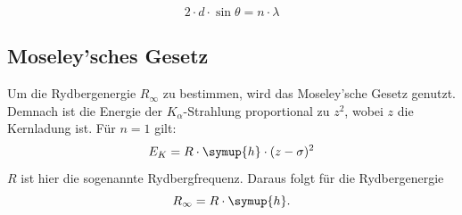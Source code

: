 \begin{equation}
    \label{eqn:BraggBedingung}
    2 \cdot d \cdot \sin\theta = n \cdot \lambda
\end{equation}

\subsection{Moseley'sches Gesetz}
\label{subsec:moseley}
Um die Rydbergenergie $R_{\infty}$ zu bestimmen, wird das Moseley'sche Gesetz genutzt.
Demnach ist die Energie der $K_\alpha$-Strahlung proportional zu $z^2$, wobei $z$ die Kernladung ist.
Für $n = 1$ gilt:
\begin{equation}
    \label{eqn:moseley}
    E_K = R \cdot \symup{h} \cdot (z - \sigma)^2
\end{equation}
$R$ ist hier die sogenannte Rydbergfrequenz.
Daraus folgt für die Rydbergenergie
\begin{equation}
    \label{eqn:rydbergenergie}
    R_{\infty} = R \cdot \symup{h}.
\end{equation}